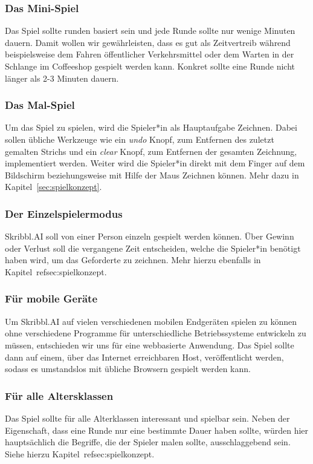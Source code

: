 \documentclass[11pt]{article}
\begin{document}
\subsubsection{Das Mini-Spiel}
Das Spiel sollte runden basiert sein und jede Runde sollte nur wenige Minuten dauern. Damit wollen wir gewährleisten, dass es gut als Zeitvertreib während beispielsweise dem Fahren öffentlicher Verkehrsmittel oder dem Warten in der Schlange im Coffeeshop gespielt werden kann. Konkret sollte eine Runde nicht länger als 2-3 Minuten dauern.
\subsubsection{Das Mal-Spiel}
Um das Spiel zu spielen, wird die Spieler*in als Hauptaufgabe Zeichnen. Dabei sollen übliche Werkzeuge wie ein \textit{undo} Knopf, zum Entfernen des zuletzt gemalten Strichs und ein \textit{clear} Knopf, zum Entfernen der gesamten Zeichnung, implementiert werden. Weiter wird die Spieler*in direkt mit dem Finger auf dem Bildschirm beziehungsweise mit Hilfe der Maus Zeichnen können. Mehr dazu in Kapitel~\ref{sec:spielkonzept}.
\subsubsection{Der Einzelspielermodus}
Skribbl.AI soll von einer Person einzeln gespielt werden können. Über Gewinn oder Verlust soll die vergangene Zeit entscheiden, welche die Spieler*in benötigt haben wird, um das Geforderte zu zeichnen. Mehr hierzu ebenfalls in Kapitel~ref{sec:spielkonzept}.
\subsubsection{Für mobile Geräte}
Um Skribbl.AI auf vielen verschiedenen mobilen Endgeräten spielen zu können ohne verschiedene Programme für unterschiedliche Betriebssysteme entwickeln zu müssen, entschieden wir uns für eine webbasierte Anwendung. Das Spiel sollte dann auf einem, über das Internet erreichbaren Host, veröffentlicht werden, sodass es umstandslos mit übliche Browsern gespielt werden kann.
\subsubsection{Für alle Altersklassen}
Das Spiel sollte für alle Alterklassen interessant und spielbar sein. Neben der Eigenschaft, dass eine Runde nur eine bestimmte Dauer haben sollte, würden hier hauptsächlich die Begriffe, die der Spieler malen sollte, ausschlaggebend sein. Siehe hierzu Kapitel~ref{sec:spielkonzept}.
\end{document}
